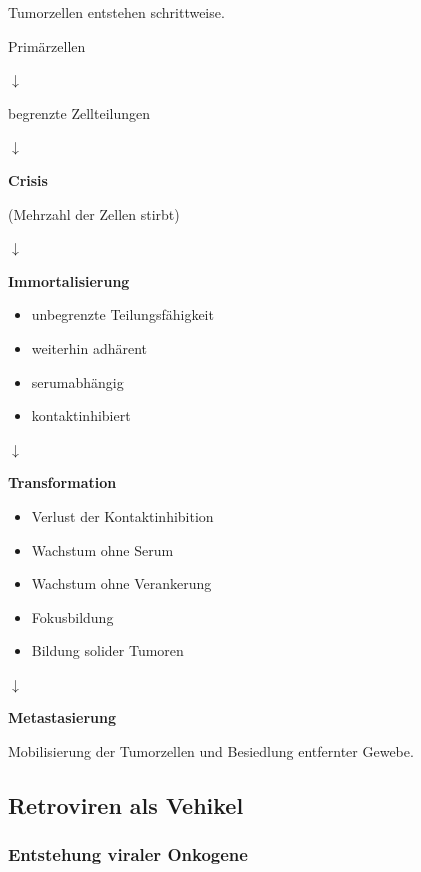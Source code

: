 Tumorzellen entstehen schrittweise.

    Primärzellen

    $\downarrow$

    begrenzte Zellteilungen

    $\downarrow$

    \textbf{Crisis}

    (Mehrzahl der Zellen stirbt)

    $\downarrow$

    \textbf{Immortalisierung}

    \begin{itemize}
        \item unbegrenzte Teilungsfähigkeit
        \item weiterhin adhärent
        \item serumabhängig
        \item kontaktinhibiert
    \end{itemize}

    $\downarrow$

    \textbf{Transformation}

    \begin{itemize}
        \item Verlust der Kontaktinhibition
        \item Wachstum ohne Serum
        \item Wachstum ohne Verankerung
        \item Fokusbildung
        \item Bildung solider Tumoren
    \end{itemize}

    $\downarrow$

    \textbf{Metastasierung}

    Mobilisierung der Tumorzellen und Besiedlung
    entfernter Gewebe.




\subsection{Retroviren als Vehikel}\label{subsec:retroviren-als-vehikel}


\subsubsection*{Entstehung viraler Onkogene}

